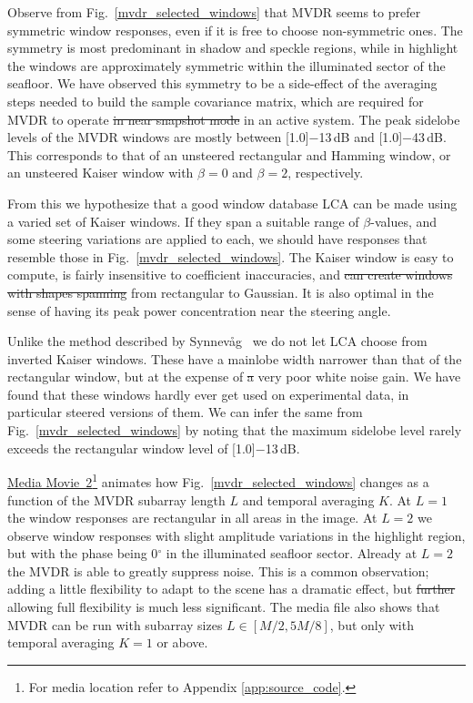 \documentclass[10pt,journal,draftclsnofoot,onecolumn]{IEEEtran}
\newcommand\Fig[1]{Fig.~\ref{#1}}
\newcommand\1{\vec 1}
\newcommand\minus{\scalebox{0.75}[1.0]{$-$}}
\newcommand\multimedia[2]{\href{#1}{#2}}
\newcommand\articlePath{http://folk.uio.no/joibu/articles/2015_JOE_LCA}
\newcommand\mediaII{\multimedia{\articlePath/media2.mp4}{Media Movie~2}}
\providecommand{\DIFadd}[1]{{\protect\color{blue}\uwave{#1}}} %
\providecommand{\DIFdel}[1]{{\protect\color{red}\sout{#1}}}                      %
\providecommand{\DIFaddbegin}{} %
\providecommand{\DIFaddend}{} %
\providecommand{\DIFdelbegin}{} %
\providecommand{\DIFdelend}{} %
\begin{document}
Observe from \Fig{mvdr_selected_windows} that MVDR seems to prefer symmetric window responses, even if it is free to choose non-symmetric ones. The symmetry is most predominant in shadow and speckle regions, while in highlight the windows are approximately symmetric within the illuminated sector of the seafloor. We have observed this symmetry to be a side-effect of the averaging steps needed to build the sample covariance matrix, which are required for MVDR to operate \DIFdelbegin \DIFdel{in near snapshot mode }\DIFdelend \DIFaddbegin \DIFadd{with very little to no temporal sample support }\DIFaddend in an active system. The peak sidelobe levels of the MVDR windows are mostly between \minus{}13\,dB and \minus{}43\,dB. This corresponds to that of an unsteered rectangular and Hamming window, or an unsteered Kaiser window with $\beta=0$ and $\beta=2$, respectively.

From this we hypothesize that a good window database LCA can be made using a varied  set of Kaiser windows. If they span a suitable range of $\beta$-values, and some steering variations are applied to each, we should have responses that resemble those in \Fig{mvdr_selected_windows}. The Kaiser window is easy to compute, is fairly insensitive to coefficient inaccuracies, and \DIFdelbegin \DIFdel{can create windows with shapes spanning }\DIFdelend \DIFaddbegin \DIFadd{span shapes }\DIFaddend from rectangular to Gaussian. It is also optimal in the sense of having its peak power concentration near the steering angle.

Unlike the method described by Synnev\aa{}g~\cite{Synnevag2011} we do not let LCA choose from inverted Kaiser windows. These have a mainlobe width narrower than that of the rectangular window, but at the expense of \DIFdelbegin \DIFdel{a }\DIFdelend very poor white noise gain. We have found that these windows hardly ever get used on experimental data, in particular steered versions of them. We can infer the same from \Fig{mvdr_selected_windows} by noting that the maximum sidelobe level rarely exceeds the rectangular window level of \minus{}13\,dB.

\mediaII{}\footnote{For media location refer to Appendix \ref{app:source_code}.} animates how \Fig{mvdr_selected_windows} changes as a function of the MVDR subarray length $L$ and temporal averaging $K$. At $L=1$ the window responses are rectangular in all areas in the image. At $L=2$ we observe window responses with slight amplitude variations in the highlight region, but with the phase being 0$^\circ$ in the illuminated seafloor sector. Already at $L=2$ the MVDR is able to greatly suppress noise. This is a common observation; adding a little flexibility to adapt to the scene has a dramatic effect, but \DIFdelbegin \DIFdel{further }\DIFdelend allowing full flexibility is much less significant. The media file also shows that MVDR can be run with subarray sizes $L\in[M/2,5M/8]$, but only with temporal averaging $K=1$ or above.
\end{document}
